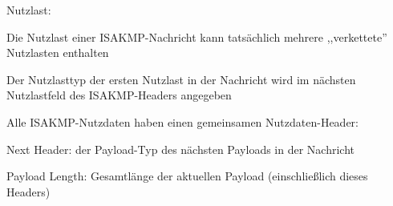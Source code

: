 \documentclass[a4paper]{article}
\begin{document}
\begin{multicols}{3}
\begin{itemize*}
            \item Nutzlast:
            \begin{itemize*}
                  \item Die Nutzlast einer ISAKMP-Nachricht kann tatsächlich mehrere ,,verkettete'' Nutzlasten enthalten
                  \item Der Nutzlasttyp der ersten Nutzlast in der Nachricht wird im nächsten Nutzlastfeld des ISAKMP-Headers angegeben
                  \item Alle ISAKMP-Nutzdaten haben einen gemeinsamen Nutzdaten-Header:
                  \begin{itemize*}
                        \item Next Header: der Payload-Typ des nächsten Payloads in der Nachricht
                        \item Payload Length: Gesamtlänge der aktuellen Payload (einschließlich dieses Headers)
                  \end{itemize*}
            \end{itemize*}
      \end{itemize*}


\end{multicols}
\end{document}
